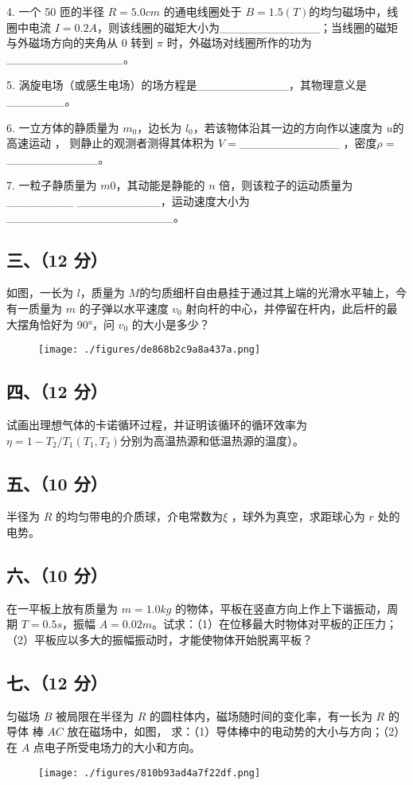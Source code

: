 4. 一个 50 匝的半径 $R=5.0cm$ 的通电线圈处于 $B=1.5(T)$的均匀磁场中，线圈中电流 $I=0.2A$，则该线圈的磁矩大小为____________；当线圈的磁矩与外磁场方向的夹角从 0 转到 $\pi$ 时，外磁场对线圈所作的功为______________。

5. 涡旋电场（或感生电场）的场方程是___________，其物理意义是_______。

6. 一立方体的静质量为 $m_0$，边长为 $l_0$，若该物体沿其一边的方向作以速度为 $u$的高速运动 ， 则静止的观测者测得其体积为 $V=$____________ ，密度$\rho=$___________。

7. 一粒子静质量为 $m0$，其动能是静能的 $n$ 倍，则该粒子的运动质量为________
__________，运动速度大小为____________________。
\subsection{三、（12 分）}
如图，一长为 $l$，质量为 $M $的匀质细杆自由悬挂于通过其上端的光滑水平轴上，今有一质量为 $m$ 的子弹以水平速度 $v_0$ 射向杆的中心，并停留在杆内，此后杆的最大摆角恰好为 90°，问 $v_0$ 的大小是多少？
\begin{figure}[ht]
\centering
\texttt{[image: ./figures/de868b2c9a8a437a.png]}
\caption{} \label{fig_NJUB07_2}
\end{figure}
\subsection{四、（12 分）}
试画出理想气体的卡诺循环过程，并证明该循环的循环效率为$\eta=1-T_2/T_1 (T_1,T_2) $分别为高温热源和低温热源的温度）。
\subsection{五、（10 分）}
半径为 $R$ 的均匀带电的介质球，介电常数为$\xi$ ，球外为真空，求距球心为 $r$ 处的电势。
\subsection{六、（10 分）}
在一平板上放有质量为 $m=1.0kg$ 的物体，平板在竖直方向上作上下谐振动，周期 $T=0.5s$，振幅 $A=0.02m$。试求：（1）在位移最大时物体对平板的正压力；（2）平板应以多大的振幅振动时，才能使物体开始脱离平板？
\subsection{七、（12 分）}
匀磁场 $B$ 被局限在半径为 $R$ 的圆柱体内，磁场随时间的变化率，有一长为 $R$ 的导体 棒 $AC$ 放在磁场中，如图， 求：（1）导体棒中的电动势的大小与方向；（2）在 $A$ 点电子所受电场力的大小和方向。
\begin{figure}[ht]
\centering
\texttt{[image: ./figures/810b93ad4a7f22df.png]}
\caption{} \label{fig_NJUB07_3}
\end{figure}
